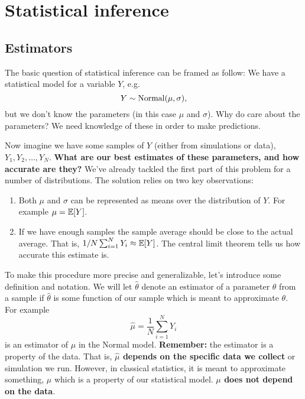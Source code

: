 \chapter{Statistical inference}




\section{Estimators}
The basic question of statistical inference can be framed as follow: We have a statistical model for a variable $Y$, e.g. 
\begin{equation}
Y \sim {\rm Normal}(\mu,\sigma),
\end{equation}
but we don't know the parameters (in this case $\mu$ and $\sigma$). Why do care about the parameters? We need knowledge of these in order to make predictions.  

Now imagine we have some samples of $Y$ (either from simulations or data), $Y_1,Y_2,\dots,Y_N$. {\bf What are our best estimates of these parameters, and  how accurate are they?} We've already tackled the first part of this problem for a number of distributions. The solution relies on two key observations: \begin{enumerate}
\item Both $\mu$ and $\sigma$ can be represented as means over the distribution of $Y$. For example $\mu = \mathbb E[Y]$. 
\item If we have enough samples the sample average should be close to the actual average.  That is, $1/N\sum_{i=1}^NY_i \approx \mathbb E[Y]$. The central limit theorem tells us how accurate this estimate is. 
\end{enumerate}


To make this procedure more precise and generalizable, let's introduce some definition and notation. We will let $\hat{\theta}$ denote an {\dfn estimator} of a parameter $\theta$ from a sample if $\hat{\theta}$ is some function of our sample which is meant to approximate $\theta$. For example 
\begin{equation}
\hat{\mu} = \frac{1}{N}\sum_{i=1}^N Y_i
\end{equation}
is an estimator of $\mu$ in the Normal model. 
{\bf Remember:} the estimator is a property of the data. That is, {\bf $\hat{\mu}$ depends on the specific data we collect} or simulation we run. However, in classical statistics, it is meant to approximate something, $\mu$ which is a property of our statistical model.  {\bf $\mu$ does not depend on the data}.

